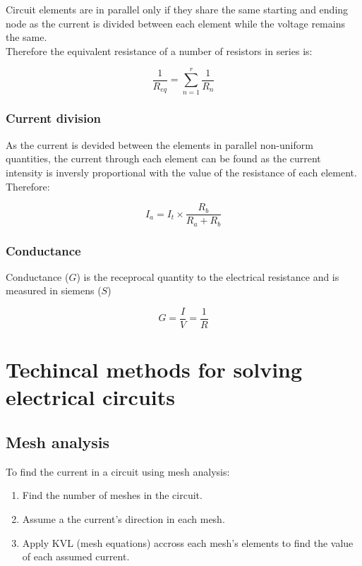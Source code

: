 \documentclass[a4paper]{book}
\begin{document}
Circuit elements are in parallel only if they share the same starting and ending node as the current is 
divided between each element while the voltage remains the same.\\
Therefore the equivalent resistance of a number of resistors in series is:

\[\frac{1}{R_{eq}} = \sum_{n=1}^r \frac{1}{R_n}\]

\subsubsection{Current division}

As the current is devided between the elements in parallel non-uniform quantities, the current through
each element can be found as the current intensity is inversly proportional with the value of the resistance of each element. Therefore:

\[I_a = I_{t} \times \frac{R_b}{R_a + R_b}\]

\subsubsection{Conductance}

Conductance ($G$) is the receprocal quantity to the electrical resistance and is measured in siemens ($S$)

\[G = \frac{I}{V} = \frac{1}{R}\]

\section{Techincal methods for solving electrical circuits}

\subsection{Mesh analysis}

To find the current in a circuit using mesh analysis:

\begin{enumerate}

  \item Find the number of meshes in the circuit.
  \item Assume a the current's direction in each mesh.
  \item Apply KVL (mesh equations) accross each mesh's elements to find the value of each assumed current.

\end{enumerate}
\end{document}
